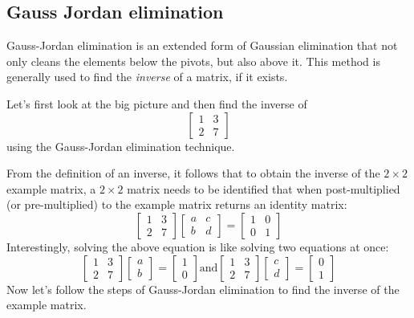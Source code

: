 \documentclass[../main.tex]{subfiles}
\begin{document}
\subsection{Gauss Jordan elimination}
Gauss-Jordan elimination is an extended form of Gaussian elimination that not only cleans the elements below the pivots, but also above it. This method is generally used to find the \emph{inverse} of a matrix, if it exists.
\vspace{0.5em}

Let's first look at the big picture and then find the inverse of
\[
    \begin{bmatrix}
        1 & 3 \\
        2 & 7
    \end{bmatrix}
\]
using the Gauss-Jordan elimination technique.
\vspace{0.5em}

From the definition of an inverse, it follows that to obtain the inverse of the \(2 \times 2\) example matrix, a \(2 \times 2\) matrix needs to be identified that when post-multiplied (or pre-multiplied) to the example matrix returns an identity matrix:
\[
    \begin{bmatrix}
        1 & 3 \\
        2 & 7
    \end{bmatrix}
    \begin{bmatrix}
        a & c \\
        b & d
    \end{bmatrix}
    =
    \begin{bmatrix}
        1 & 0 \\
        0 & 1
    \end{bmatrix}
\]
Interestingly, solving the above equation is like solving two equations at once:
\[
    \begin{bmatrix}
        1 & 3 \\
        2 & 7
    \end{bmatrix}
    \begin{bmatrix}
        a \\
        b
    \end{bmatrix}
    =
    \begin{bmatrix}
        1 \\
        0
    \end{bmatrix}
    \text{and}
    \begin{bmatrix}
        1 & 3 \\
        2 & 7
    \end{bmatrix}
    \begin{bmatrix}
        c \\
        d
    \end{bmatrix}
    =
    \begin{bmatrix}
        0 \\
        1
    \end{bmatrix}
\]
Now let's follow the steps of Gauss-Jordan elimination to find the inverse of the example matrix.
\end{document}
